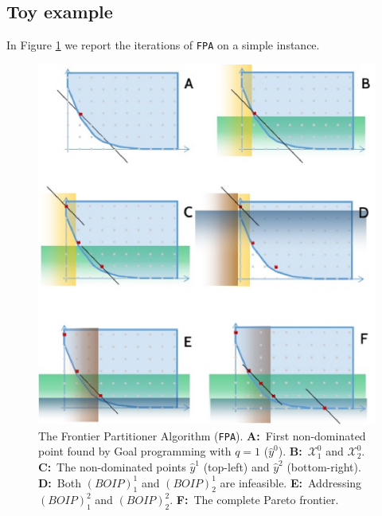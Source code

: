 \documentclass[preprint,12pt]{elsarticle}
\begin{document}
\subsection{Toy example}\label{sec:toy}
In Figure \ref{fig:example} we report the iterations of \texttt{FPA} on a simple instance.

\begin{figure}
\caption{The Frontier Partitioner Algorithm (\texttt{FPA}). \textbf{A:}~First non-dominated point found by Goal programming with $q=1$ ($\hat y^0$). \textbf{B:}~$\mathcal{X}^0_1$ and $\mathcal{X}^0_2$.
\textbf{C:}~The non-dominated points $\hat y^1$ (top-left) and $\hat y^2$ (bottom-right).
\textbf{D:}~Both $(BOIP)^1_1$ and $(BOIP)^1_2$ are infeasible.
\textbf{E:}~Addressing $(BOIP)^2_1$ and $(BOIP)^2_2$. \textbf{F:}~The complete Pareto frontier.}
\label{fig:example}
\includegraphics[scale=1]{example.eps}
\end{figure}
\end{document}
